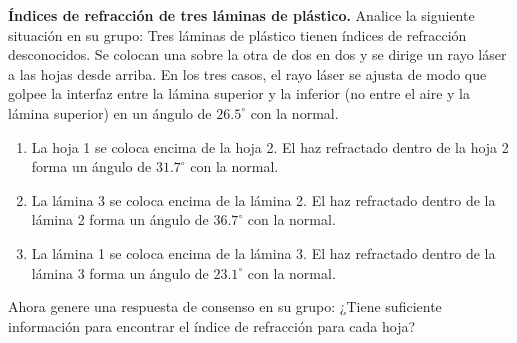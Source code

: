\item \textbf{Índices de refracción de tres láminas de plástico.}
Analice la siguiente situación en su grupo: Tres láminas de plástico tienen índices de refracción desconocidos. Se colocan una sobre la otra de dos en dos y se dirige un rayo láser a las hojas desde arriba. En los tres casos, el rayo láser se ajusta de modo que golpee la interfaz entre la lámina superior y la inferior (no entre el aire y la lámina superior) en un ángulo de $26.5^\circ$ con la normal.

\begin{center}
\end{center}
\begin{enumerate}[label=(\roman*)]
    \item La hoja 1 se coloca encima de la hoja 2. El haz refractado dentro de la hoja 2 forma un ángulo de $31.7^\circ$ con la normal.
    \item La lámina 3 se coloca encima de la lámina 2. El haz refractado dentro de la lámina 2 forma un ángulo de $36.7^\circ$ con la normal.
    \item La lámina 1 se coloca encima de la lámina 3. El haz refractado dentro de la lámina 3 forma un ángulo de $23.1^\circ$ con la normal.
\end{enumerate}
Ahora genere una respuesta de consenso en su grupo: ¿Tiene suficiente información para encontrar el índice de refracción para cada hoja?